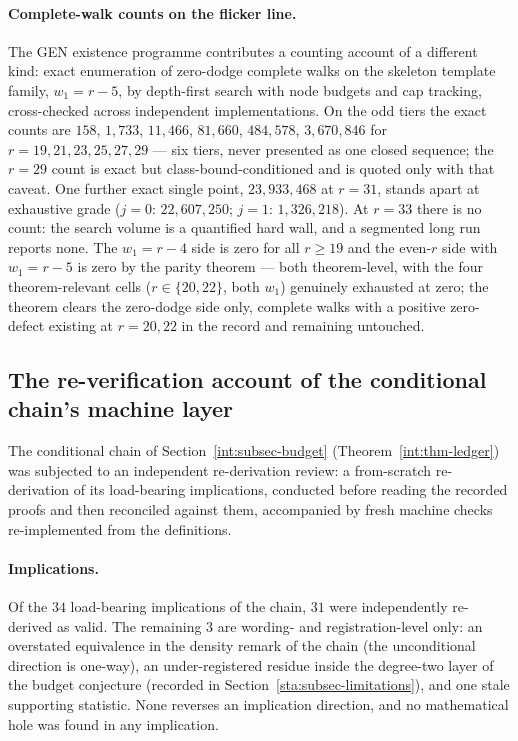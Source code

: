 \paragraph{Complete-walk counts on the flicker line.} The GEN existence
programme contributes a counting account of a different kind: exact
enumeration of zero-dodge complete walks on the skeleton template family,
$w_1=r-5$, by depth-first search with node budgets and cap tracking,
cross-checked across independent implementations. On the odd tiers the
exact counts are $158$, $1{,}733$, $11{,}466$, $81{,}660$, $484{,}578$,
$3{,}670{,}846$ for $r=19,21,23,25,27,29$ --- six tiers, never presented
as one closed sequence; the $r=29$ count is exact but
class-bound-conditioned and is quoted only with that caveat. One further
exact single point, $23{,}933{,}468$ at $r=31$, stands apart at
exhaustive grade ($j=0$: $22{,}607{,}250$; $j=1$: $1{,}326{,}218$). At
$r=33$ there is no count: the search volume is a quantified hard wall,
and a segmented long run reports none. The $w_1=r-4$ side is zero for all
$r\ge19$ and the even-$r$ side with $w_1=r-5$ is zero by the parity
theorem --- both theorem-level, with the four theorem-relevant cells
($r\in\{20,22\}$, both $w_1$) genuinely exhausted at zero; the theorem
clears the zero-dodge side only, complete walks with a positive
zero-defect existing at $r=20,22$ in the record and remaining untouched.

\subsection{The re-verification account of the conditional chain's machine
layer}\label{com:subsec-kline}

The conditional chain of Section~\ref{int:subsec-budget} (Theorem~\ref{int:thm-ledger})
was subjected to an independent
re-derivation review: a from-scratch re-derivation of its load-bearing
implications, conducted before reading the recorded proofs and then
reconciled against them, accompanied by fresh machine checks re-implemented
from the definitions.

\paragraph{Implications.} Of the $34$ load-bearing implications of the chain,
$31$ were independently re-derived as valid. The remaining $3$ are
wording- and registration-level only: an overstated equivalence in the
density remark of the chain (the unconditional direction is one-way), an
under-registered residue inside the degree-two layer of the budget
conjecture (recorded in Section~\ref{sta:subsec-limitations}), and one
stale supporting statistic. None reverses an implication direction, and no
mathematical hole was found in any implication.

